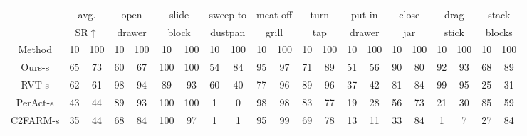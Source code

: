 \begin{table*}[!ht]
\centering
\scriptsize
\begin{tabular}{ccccccccccccccccccccc}
\toprule
       & \multicolumn{2}{c}{avg.}& \multicolumn{2}{c}{open}  & \multicolumn{2}{c}{slide}  & \multicolumn{2}{c}{sweep to} & \multicolumn{2}{c}{meat off} & \multicolumn{2}{c}{turn}  & \multicolumn{2}{c}{put in}  & \multicolumn{2}{c}{close}  & \multicolumn{2}{c}{drag}  & \multicolumn{2}{c}{stack}  \\
       & \multicolumn{2}{c}{SR$\uparrow$} & \multicolumn{2}{c}{drawer} & \multicolumn{2}{c}{block}  & \multicolumn{2}{c}{dustpan}  & \multicolumn{2}{c}{grill}    & \multicolumn{2}{c}{tap}   & \multicolumn{2}{c}{drawer}  & \multicolumn{2}{c}{jar}    & \multicolumn{2}{c}{stick} & \multicolumn{2}{c}{blocks} \\ \rule{0pt}{3ex} 
Method & 10 & 100     & 10          & 100          & 10           & 100         & 10           & 100           & 10           & 100           & 10          & 100         & 10           & 100          & 10           & 100         & 10          & 100         & 10           & 100         \\ \midrule
Ours-s  & 65 & 73 & 60        & 67           & 100          & 100         & 54           & 84            & 95           & 97            & 71          & 89          & 51           & 56           & 90           & 80          & 92          & 93          & 68           & 89            \\
RVT-s   & 62 & 61 & 98         & 94           & 89           & 93          & 60           & 40            & 77           & 96            & 89          & 96          & 37           & 42           & 81           & 84          & 99          & 95          & 25           & 31          \\
PerAct-s & 43 & 44 &89       & 93           & 100          & 100         & 1            & 0             & 98           & 98            & 83          & 77          & 19           & 28           & 56           & 73          & 21          & 30          & 85           & 59          \\
C2FARM-s & 35 & 44 &68     & 84           & 100          & 97          & 1            & 1             & 95           & 99            & 69          & 78          & 13           &  11          & 33           & 84          & 1           & 7           & 27           &  84         \\ 

\end{tabular}
\end{table*}
